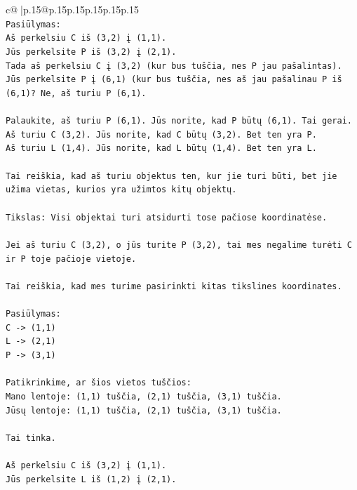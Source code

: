 \documentclass{article}
\begin{document}
{\begin{supertabular}{c@{$\;$}|p{.15\linewidth}@{}p{.15\linewidth}p{.15\linewidth}p{.15\linewidth}p{.15\linewidth}p{.15\linewidth}}
{{{\\ 
\texttt{Pasiūlymas:} \\
\texttt{Aš perkelsiu C iš (3,2) į (1,1).} \\
\texttt{Jūs perkelsite P iš (3,2) į (2,1).} \\
\texttt{Tada aš perkelsiu C į (3,2) (kur bus tuščia, nes P jau pašalintas).} \\
\texttt{Jūs perkelsite P į (6,1) (kur bus tuščia, nes aš jau pašalinau P iš (6,1)? Ne, aš turiu P (6,1).} \\
\\ 
\texttt{Palaukite, aš turiu P (6,1). Jūs norite, kad P būtų (6,1). Tai gerai.} \\
\texttt{Aš turiu C (3,2). Jūs norite, kad C būtų (3,2). Bet ten yra P.} \\
\texttt{Aš turiu L (1,4). Jūs norite, kad L būtų (1,4). Bet ten yra L.} \\
\\ 
\texttt{Tai reiškia, kad aš turiu objektus ten, kur jie turi būti, bet jie užima vietas, kurios yra užimtos kitų objektų.} \\
\\ 
\texttt{Tikslas: Visi objektai turi atsidurti tose pačiose koordinatėse.} \\
\\ 
\texttt{Jei aš turiu C (3,2), o jūs turite P (3,2), tai mes negalime turėti C ir P toje pačioje vietoje.} \\
\\ 
\texttt{Tai reiškia, kad mes turime pasirinkti kitas tikslines koordinates.} \\
\\ 
\texttt{Pasiūlymas:} \\
\texttt{C {-}> (1,1)} \\
\texttt{L {-}> (2,1)} \\
\texttt{P {-}> (3,1)} \\
\\ 
\texttt{Patikrinkime, ar šios vietos tuščios:} \\
\texttt{Mano lentoje: (1,1) tuščia, (2,1) tuščia, (3,1) tuščia.} \\
\texttt{Jūsų lentoje: (1,1) tuščia, (2,1) tuščia, (3,1) tuščia.} \\
\\ 
\texttt{Tai tinka.} \\
\\ 
\texttt{Aš perkelsiu C iš (3,2) į (1,1).} \\
\texttt{Jūs perkelsite L iš (1,2) į (2,1).} \\
}}}
\end{supertabular}}
\end{document}
